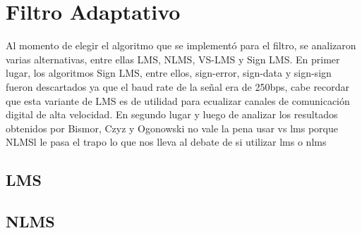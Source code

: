 \documentclass[main.tex]{subfiles}
\begin{document}
\section{Filtro Adaptativo}
Al momento de elegir el algoritmo que se implementó para el filtro, 
se analizaron varias alternativas, entre ellas LMS, NLMS, VS-LMS y Sign LMS.
En primer lugar, los algoritmos Sign LMS, entre ellos, sign-error, sign-data
y sign-sign fueron descartados ya que el baud rate de la señal era de 250bps,
cabe recordar que esta variante de LMS es de utilidad para ecualizar canales de
comunicación digital de alta velocidad. En segundo lugar y  luego de analizar 
los resultados obtenidos por Bismor\cite{}, Czyz y Ogonowski\cite{bismor} no vale la pena usar vs lms porque NLMSl
le pasa el trapo lo que nos lleva al debate de si utilizar lms o nlms
\subsection{LMS}
\subsection{NLMS}
\end{document}
